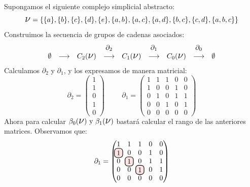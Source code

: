 \documentclass[12pt, a4paper]{article}
\newcommand\hlightr[1]{\tikz[overlay, remember picture,baseline=-
\the\dimexpr\fontdimen22\textfont2\relax]\node[rectangle,fill=red!50,rounded 
corners,fill opacity = 0.2,draw,thick,text opacity =1] {$#1$};}
\numberwithin{equation}{section}
\theoremstyle{definition}
\newenvironment{ejem}
  {\pushQED{\qed}\renewcommand{\qedsymbol}{$\blacktriangleleft$}\ejemplo}
  {\popQED\endejemplo}
\theoremstyle{remark}
\theoremstyle{plain}
\begin{document}
	\begin{ejem}
		Supongamos el siguiente complejo simplicial abstracto:
		\begin{equation*} 
			\text{{\Large $\nu$}}=\{\{a\},\{b\},\{c\},\{d\},\{e\},
			\{a,b\},\{a,c\},\{a,d\},\{b,c\},\{c,d\},\{a,b,c\}\}
		\end{equation*}
		Construimos la secuencia de grupos de cadenas asociados:
		\begin{equation*}
			 \left.
			\begin{array}{ccccccccc}
				 &  &  & \partial_{2} &  & 
				\partial_{1} &  & \partial_{0} & \\ 
				\emptyset & \longrightarrow & C_{2}(
				\text{{\Large $\nu$}}) & 
				\longrightarrow & C_{1}(\text{{\Large $\nu$}}) 
						& \longrightarrow 
				& C_{0}(\text{{\Large $\nu$}}) & 
				\longrightarrow & \emptyset 
			\end{array}
			\right. 
		\end{equation*}
		Calculamos $\partial_{2}$ y $\partial_{1}$, y los expresamos 
		de manera matricial:
		\begin{equation*}
			\partial_{2}=
			\begin{pmatrix}
			1 \\
			1 \\
			0 \\
			1 \\
			0
			\end{pmatrix}
			\hspace{1cm}
			\partial_{1}=
			\begin{pmatrix}
			1 & 1 & 1 & 0 & 0\\
			1 & 0 & 0 & 1 & 0\\
			0 & 1 & 0 & 1 & 1\\
			0 & 0 & 1 & 0 & 1\\
			0 & 0 & 0 & 0 & 0
			\end{pmatrix}
		\end{equation*}
		Ahora para calcular $\beta_{0}(\text{{\Large $\nu$}}) 
		\text{ y } \beta_{1}(\text{{\Large $\nu$}})$ bastará
		calcular el rango de las anteriores matrices. Observamos que:
		\begin{equation*}
			\partial_{1}=
			\begin{pmatrix}
			1 & 1 & 1 & 0 & 0\\
			\hlightr{1} & 0 & 0 & 1 & 0\\
			0 & \hlightr{1} & 0 & 1 & 1\\
			0 & 0 & \hlightr{1} & 0 & 1\\
			0 & 0 & 0 & 0 & 0

\end{pmatrix}
\end{equation*}
\end{ejem}
\end{document}
